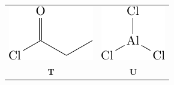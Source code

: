 \documentclass{article}
\begin{document}
	\begin{tabular}{cc}
		\includegraphics{subfigures/propanoyl-chloride.pdf} & \includegraphics{subfigures/aluminum-chloride.pdf} \\
		\textbf{T} & \textbf{U}
	\end{tabular}
\end{document}

